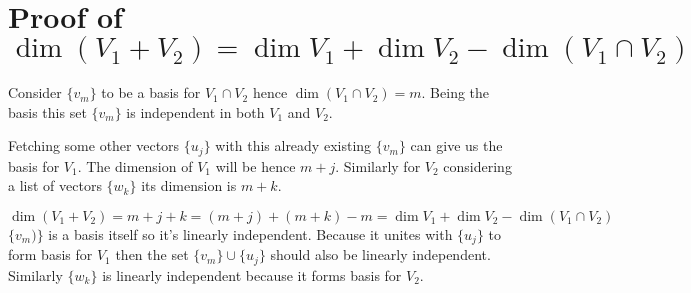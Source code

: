 \documentclass[letter]{article}
\begin{document}
\section*{Proof of $\dim(V_1 + V_2) = \dim V_1 + \dim V_2 - \dim(V_1 \cap  V_2)$ } 
Consider $\{v_m\} $ to be a basis for $V_1 \cap  V_2$ hence $\dim (V_1 \cap  V_2) = m$. Being the basis this set $\{v_m\}  $ is independent in both $V_1$ and $V_2$. 

Fetching some other vectors $\{u_j\} $ with this already existing $\{v_m\} $ can give us the basis for $V_1$. The dimension of $V_1 $ will be hence $m+j$. Similarly for $V_2$ considering a list of vectors $\{w_k\} $ its dimension is $m + k$. 

\[
\dim(V_1 + V_2) = m + j + k = (m+j) + (m+k) - m = \dim V_1 + \dim V_2 - \dim (V_1 \cap  V_2)
\]
$\{v_m)\} $ is a basis itself so it's linearly independent. Because it unites with $\{u_j\} $ to form basis for $V_1$ then the set $\{v_m\} \cup \{u_j\} $ should also be linearly independent. Similarly $\{w_k\} $ is linearly independent because it forms basis for $V_2.$ 
\end{document}
